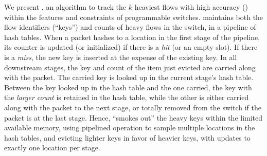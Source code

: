 We present \TheSystem,  an algorithm to track the $k$ heaviest flows with high
accuracy () within the features and constraints of
programmable switches. \TheSystem maintains both the
flow identifiers (``keys'') and counts of heavy flows in the switch, in a
pipeline of hash tables. 
When a packet hashes to a location in the first stage of the pipeline,
its counter is updated (or initialized) if there is a {\em hit} (or an empty
slot). If there is a {\em miss}, the new key is inserted at the expense of the
existing key. In all downstream stages, the key and count of the
item just evicted are carried along with the packet. The carried key is
looked up in
the current stage's hash table. Between the key looked up in the hash table and
the one carried, the key with the {\em larger count} is retained in the hash
table, while the other is either carried along with the packet to the next
stage, or totally removed from the switch if the packet is at the last
stage. Hence, \TheSystem ``smokes out'' the heavy keys within the limited
available memory, using pipelined operation to sample multiple locations in the
hash tables, and evicting lighter keys in favor of heavier
keys, with updates to exactly one location per stage. %

